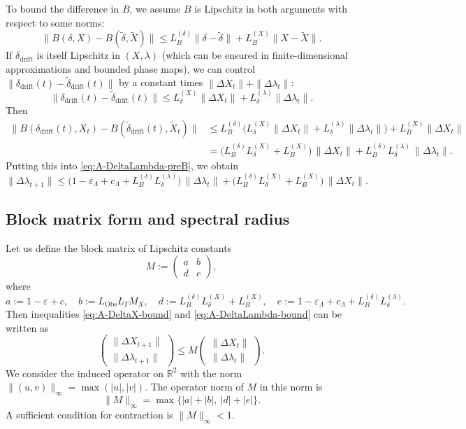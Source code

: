 \documentclass[11pt]{article}
\begin{document}
To bound the difference in $B$, we assume $B$ is Lipschitz in both arguments with respect to some norms:
\[
\|B(\delta,X)-B(\tilde{\delta},\tilde{X})\|
\le L_B^{(\delta)} \|\delta-\tilde{\delta}\|
   + L_B^{(X)} \|X-\tilde{X}\|.
\]
If $\delta_{\mathrm{drift}}$ is itself Lipschitz in $(X,\lambda)$ (which can be ensured in finite-dimensional approximations and bounded phase maps), we can control $\|\delta_{\mathrm{drift}}(t)-\tilde{\delta}_{\mathrm{drift}}(t)\|$ by a constant times $\|\Delta X_t\| + \|\Delta\lambda_t\|$:
\[
\|\delta_{\mathrm{drift}}(t)-\tilde{\delta}_{\mathrm{drift}}(t)\|
\le L_\delta^{(X)} \|\Delta X_t\| + L_\delta^{(\lambda)} \|\Delta\lambda_t\|.
\]
Then
\begin{align*}
\|B(\delta_{\mathrm{drift}}(t),X_t)
   - B(\tilde{\delta}_{\mathrm{drift}}(t),\tilde{X}_t)\|
&\le L_B^{(\delta)} 
    \bigl(L_\delta^{(X)} \|\Delta X_t\| + L_\delta^{(\lambda)} \|\Delta\lambda_t\|\bigr)
   + L_B^{(X)} \|\Delta X_t\|\\
&= \bigl(L_B^{(\delta)} L_\delta^{(X)} + L_B^{(X)}\bigr)\,\|\Delta X_t\|
   + L_B^{(\delta)} L_\delta^{(\lambda)}\,\|\Delta\lambda_t\|.
\end{align*}
Putting this into \eqref{eq:A-DeltaLambda-preB}, we obtain
\begin{equation}
\|\Delta\lambda_{t+1}\|
\le \bigl(1-\varepsilon_\Lambda+c_\Lambda 
          + L_B^{(\delta)} L_\delta^{(\lambda)}\bigr)\,\|\Delta\lambda_t\|
   + \bigl(L_B^{(\delta)} L_\delta^{(X)} + L_B^{(X)}\bigr)\,\|\Delta X_t\|.
\label{eq:A-DeltaLambda-bound}
\end{equation}

\subsection{Block matrix form and spectral radius}

Let us define the block matrix of Lipschitz constants
\[
M := 
\begin{pmatrix}
a & b \\
d & e
\end{pmatrix},
\]
where
\[
a := 1-\varepsilon + c, \quad
b := L_{\mathrm{Obs}} L_T M_X,\quad
d := L_B^{(\delta)} L_\delta^{(X)} + L_B^{(X)},\quad
e := 1-\varepsilon_\Lambda+c_\Lambda + L_B^{(\delta)} L_\delta^{(\lambda)}.
\]
Then inequalities \eqref{eq:A-DeltaX-bound} and \eqref{eq:A-DeltaLambda-bound} can be written as
\[
\begin{pmatrix}
\|\Delta X_{t+1}\| \\
\|\Delta\lambda_{t+1}\|
\end{pmatrix}
\le
M
\begin{pmatrix}
\|\Delta X_{t}\| \\
\|\Delta\lambda_{t}\|
\end{pmatrix}.
\]
We consider the induced operator on $\mathbb{R}^2$ with the norm $\|(u,v)\|_\infty = \max(|u|,|v|)$. The operator norm of $M$ in this norm is
\[
\|M\|_\infty = \max\{ |a|+|b|,\ |d|+|e|\}.
\]
A sufficient condition for contraction is $\|M\|_\infty < 1$.
\end{document}
